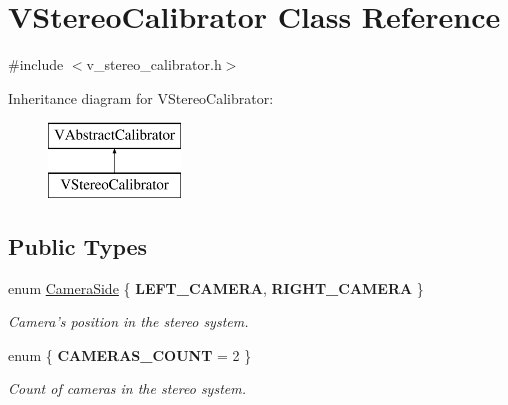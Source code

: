 \hypertarget{classVStereoCalibrator}{
\section{VStereoCalibrator Class Reference}
\label{classVStereoCalibrator}
}


{\ttfamily \#include $<$v\_\-stereo\_\-calibrator.h$>$}

Inheritance diagram for VStereoCalibrator:\begin{figure}[H]
\begin{center}
\leavevmode
\includegraphics[height=2cm]{classVStereoCalibrator}
\end{center}
\end{figure}
\subsection*{Public Types}
\begin{DoxyCompactItemize}
\item 
enum \hyperlink{classVStereoCalibrator_a2a31c8af7740705eda798588a5311fb7}{CameraSide} \{ {\bfseries LEFT\_\-CAMERA}, 
{\bfseries RIGHT\_\-CAMERA}
 \}
\begin{DoxyCompactList}\small\item\em Camera's position in the stereo system. \item\end{DoxyCompactList}\item 
enum \{ {\bfseries CAMERAS\_\-COUNT} =  2
 \}
\begin{DoxyCompactList}\small\item\em Count of cameras in the stereo system. \item\end{DoxyCompactList}\end{DoxyCompactItemize}
